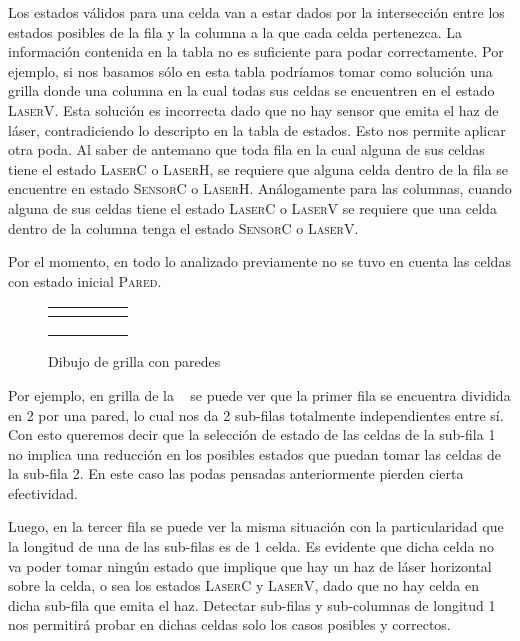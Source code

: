 \documentclass[11pt, a4paper, twoside]{article}
\begin{document}
Los estados válidos para una celda van a estar dados por la intersección
entre los estados posibles de la fila y la columna a la que cada celda pertenezca.
La información contenida en la tabla no es suficiente para podar correctamente.
Por ejemplo, si nos basamos sólo en esta tabla podríamos tomar como solución una grilla
donde una columna en la cual todas sus celdas se encuentren en el estado \textsc{LaserV}.
Esta solución es incorrecta dado que no hay sensor que emita el haz de láser,
contradiciendo lo descripto en la tabla de estados. Esto nos permite aplicar otra poda.
Al saber de antemano que toda fila en la cual alguna de sus celdas tiene el estado \textsc{LaserC} o \textsc{LaserH},
se requiere que alguna celda dentro de la fila se encuentre en estado \textsc{SensorC} o \textsc{LaserH}.
Análogamente para las columnas, cuando alguna de sus celdas tiene el estado \textsc{LaserC} o \textsc{LaserV}
se requiere que una celda dentro de la columna tenga el estado \textsc{SensorC} o \textsc{LaserV}.

Por el momento, en todo lo analizado previamente no se tuvo en cuenta las celdas con estado inicial \textsc{Pared}.

\begin{figure}[H]
	\begin{center}
		\begin{tabular}{ | l | l | l | l | l | }
			\hline 
			&$ $ & \cellcolor{black}&  &\\ \hline 
			& & &  &\\ \hline 
			\cellcolor{black}& &\cellcolor{black} &  &\cellcolor{black} \\ \hline 
			& & &  &\\ \hline 
		\end{tabular}
		\caption{Dibujo de grilla con paredes}
		\label{fig:grilla-pared}
	\end{center}
\end{figure}

Por ejemplo, en grilla de la ~ se puede ver que la primer fila
se encuentra dividida en 2 por una pared, lo cual nos da 2 sub-filas totalmente independientes entre sí.
Con esto queremos decir que la selección de estado de las celdas de la sub-fila 1 no implica
una reducción en los posibles estados que puedan tomar las celdas de la sub-fila 2.
En este caso las podas pensadas anteriormente pierden cierta efectividad.

Luego, en la tercer fila se puede ver la misma situación con la particularidad
que la longitud de una de las sub-filas es de 1 celda. Es evidente que dicha celda 
no va poder tomar ningún estado que implique que hay un haz de láser horizontal sobre la celda,
o sea los estados \textsc{LaserC} y \textsc{LaserV}, dado que no hay celda en dicha sub-fila que emita el haz.
Detectar sub-filas y sub-columnas de longitud 1 nos permitirá probar en dichas celdas solo los casos posibles y correctos.
\end{document}
